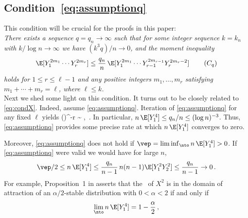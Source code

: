 \subsection{Condition~\eqref{eq:assumptionq}}
This condition will be crucial for the proofs in this paper:\\[1mm]
{\em There exists a sequence $q=q_n\to \infty$ such that for some integer sequence $k=k_n$ 
with $k/\log n \to \infty$ we have $(k^3 q)/n \to 0$, and the moment inequality
\begin{equation}\label{eq:assumptionq}
\E[ Y_{1}^{2m_1}\cdots Y_{r}^{2m_r} ] \le 
 \frac{q_n}{n} \, \E[ Y_{1}^{2m_1}\cdots Y_{r-1}^{2m_{r-1}}Y_{r}^{2m_r-2} ]\, \tag{$C_q$}
\end{equation}
holds for $1\le r\le \ell-1$ and any positive integers $m_1,\ldots,m_r$ satisfying $m_1+\cdots +m_r=\ell$, where $\ell \le k$.}\\[1mm]
Next we shed some light on this condition. It turns out to be closely related to \eqref{eq:condX}. Indeed, assume \eqref{eq:assumptionq}. Iteration of \eqref{eq:assumptionq} for any fixed $\ell$ yields
\beao
\E[ Y_{1}^{2m_1}\cdots Y_{r}^{2m_r} ] \le  \big(\big)^{\ell-r} \E[ Y_{1}^{2}\cdots Y_{r}^{2} ]
\sim {} , \quad \nto\,.
\eeao
In particular, $n\,\E[Y_{1}^4]\le q_n/n\le (\log n)^{-3}$. Thus,  \eqref{eq:assumptionq} provides some precise rate at which 
$n\,\E[Y_{1}^4]$ converges to zero.
\par
Moreover, \eqref{eq:assumptionq} does not hold if $\vep=\liminf_{\nto} n\,\E [ Y_{1}^4 ] >0$.
If \eqref{eq:assumptionq} were valid we would have for large $n$,
\begin{equation*}
\vep/2 \le n\,\E[Y_1^4] \le \frac{q_n}{n-1} \, n(n-1) \E[Y_1^2Y_2^2]\le \frac{q_n}{n-1}\to 0\,.
\end{equation*}
For example, Proposition~1 in \cite{mason:zinn:2005} asserts that the \ds\ of $X^2$ is in the 
domain of attraction of an $\alpha/2$-stable distribution with $0< \alpha <2$ if and only if
\begin{equation}\label{eq:limita<2}
\lim_{\nto} n\,\E[Y_{1}^4] =1-\frac{\alpha}{2}\,,
\end{equation}
